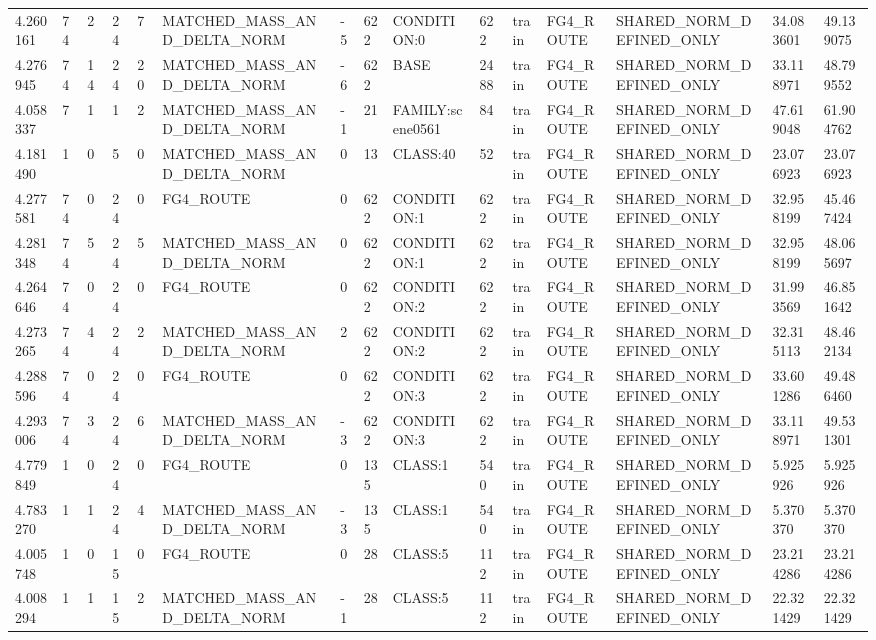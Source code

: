 \begin{tabular}{lllllllllllllll}
4.260161 & 74 & 2 & 24 & 7 & MATCHED\_MASS\_AND\_DELTA\_NORM & -5 & 622 & CONDITION:0 & 622 & train & FG4\_ROUTE & SHARED\_NORM\_DEFINED\_ONLY & 34.083601 & 49.139075 \\
4.276945 & 74 & 14 & 24 & 20 & MATCHED\_MASS\_AND\_DELTA\_NORM & -6 & 622 & BASE & 2488 & train & FG4\_ROUTE & SHARED\_NORM\_DEFINED\_ONLY & 33.118971 & 48.799552 \\
4.058337 & 7 & 1 & 1 & 2 & MATCHED\_MASS\_AND\_DELTA\_NORM & -1 & 21 & FAMILY:scene0561 & 84 & train & FG4\_ROUTE & SHARED\_NORM\_DEFINED\_ONLY & 47.619048 & 61.904762 \\
4.181490 & 1 & 0 & 5 & 0 & MATCHED\_MASS\_AND\_DELTA\_NORM & 0 & 13 & CLASS:40 & 52 & train & FG4\_ROUTE & SHARED\_NORM\_DEFINED\_ONLY & 23.076923 & 23.076923 \\
4.277581 & 74 & 0 & 24 & 0 & FG4\_ROUTE & 0 & 622 & CONDITION:1 & 622 & train & FG4\_ROUTE & SHARED\_NORM\_DEFINED\_ONLY & 32.958199 & 45.467424 \\
4.281348 & 74 & 5 & 24 & 5 & MATCHED\_MASS\_AND\_DELTA\_NORM & 0 & 622 & CONDITION:1 & 622 & train & FG4\_ROUTE & SHARED\_NORM\_DEFINED\_ONLY & 32.958199 & 48.065697 \\
4.264646 & 74 & 0 & 24 & 0 & FG4\_ROUTE & 0 & 622 & CONDITION:2 & 622 & train & FG4\_ROUTE & SHARED\_NORM\_DEFINED\_ONLY & 31.993569 & 46.851642 \\
4.273265 & 74 & 4 & 24 & 2 & MATCHED\_MASS\_AND\_DELTA\_NORM & 2 & 622 & CONDITION:2 & 622 & train & FG4\_ROUTE & SHARED\_NORM\_DEFINED\_ONLY & 32.315113 & 48.462134 \\
4.288596 & 74 & 0 & 24 & 0 & FG4\_ROUTE & 0 & 622 & CONDITION:3 & 622 & train & FG4\_ROUTE & SHARED\_NORM\_DEFINED\_ONLY & 33.601286 & 49.486460 \\
4.293006 & 74 & 3 & 24 & 6 & MATCHED\_MASS\_AND\_DELTA\_NORM & -3 & 622 & CONDITION:3 & 622 & train & FG4\_ROUTE & SHARED\_NORM\_DEFINED\_ONLY & 33.118971 & 49.531301 \\
4.779849 & 1 & 0 & 24 & 0 & FG4\_ROUTE & 0 & 135 & CLASS:1 & 540 & train & FG4\_ROUTE & SHARED\_NORM\_DEFINED\_ONLY & 5.925926 & 5.925926 \\
4.783270 & 1 & 1 & 24 & 4 & MATCHED\_MASS\_AND\_DELTA\_NORM & -3 & 135 & CLASS:1 & 540 & train & FG4\_ROUTE & SHARED\_NORM\_DEFINED\_ONLY & 5.370370 & 5.370370 \\
4.005748 & 1 & 0 & 15 & 0 & FG4\_ROUTE & 0 & 28 & CLASS:5 & 112 & train & FG4\_ROUTE & SHARED\_NORM\_DEFINED\_ONLY & 23.214286 & 23.214286 \\
4.008294 & 1 & 1 & 15 & 2 & MATCHED\_MASS\_AND\_DELTA\_NORM & -1 & 28 & CLASS:5 & 112 & train & FG4\_ROUTE & SHARED\_NORM\_DEFINED\_ONLY & 22.321429 & 22.321429 \\

\end{tabular}

